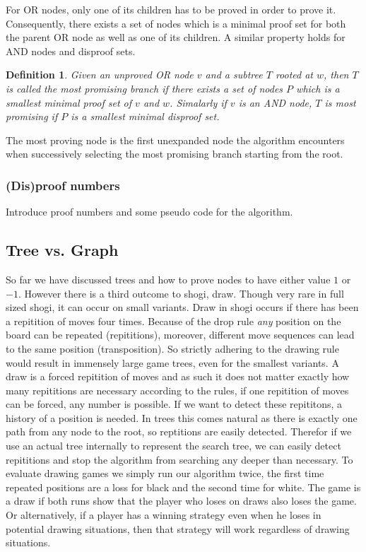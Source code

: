 \documentclass{article}
\newtheorem{mydef}{Definition}
\begin{document}
For OR nodes, only one of its children has to be proved in order to prove it. Consequently, there exists a set of nodes which is a minimal
proof set for both the parent OR node as well as one of its children. A similar property holds for AND nodes and disproof sets.
\begin{mydef}
Given an unproved OR node $v$ and a subtree $T$ rooted at $w$, then $T$ is called the most promising branch if there exists a set of nodes $P$
which is a smallest minimal proof set of $v$ and $w$. Simalarly if $v$ is an AND node, $T$ is most promising if $P$ is a smallest minimal disproof set.
\end{mydef}
The most proving node is the first unexpanded node the algorithm encounters when successively selecting the most promising branch starting from
the root.

\subsubsection*{(Dis)proof numbers}
Introduce proof numbers and some pseudo code for the algorithm.

\subsection{Tree vs. Graph}
So far we have discussed trees and how to prove nodes to have either value $1$ or $-1$. However there is a third outcome to shogi, draw. Though
very rare in full sized shogi, it can occur on small variants. Draw in shogi occurs if there has been a repitition
of moves four times. Because of the drop rule \textit{any} position on the board can be repeated (repititions), moreover, different move
sequences can lead to the same position (transposition). So strictly adhering to the drawing rule would result in immensely large game trees,
even for the smallest variants.
A draw is a forced repitition of moves and as such it does not matter exactly how many repititions are necessary according to the rules,
if one repitition of moves can be forced, any number is possible. If we want to detect these repititons, a history of a position is needed. In trees this
comes natural as there is exactly one path from any node to the root, so reptitions are easily detected. Therefor if we use an actual tree internally
to represent the search tree, we can easily detect repititions and stop the algorithm from searching any deeper than necessary.
To evaluate drawing games we simply run our algorithm twice, the first time repeated positions are a loss for black and the second time for white.
The game is a draw if both runs show that the player who loses on draws also loses the game. Or alternatively, if a player has a winning strategy
even when he loses in potential drawing situations, then that strategy will work regardless of drawing situations.\\
\end{document}
